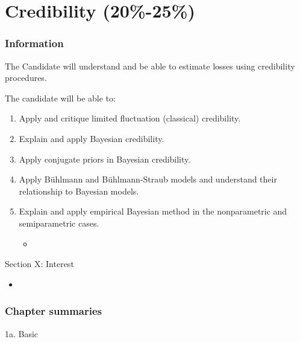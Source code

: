 \chapter[Credibility]{Credibility (20\%-25\%)}

\subsection{Information}

\begin{distributions}[Objective]
The Candidate will understand and be able to estimate losses using credibility procedures.
\end{distributions}

\begin{outcomes}
The candidate will be able to:
\begin{enumerate}[label = \alph*), leftmargin = *]
	\item	Apply and critique limited fluctuation (classical) credibility.
	\item	Explain and apply Bayesian credibility.
	\item	Apply conjugate priors in Bayesian credibility.
	\item	Apply Bühlmann and Bühlmann-Straub models and understand their relationship to Bayesian models.
	\item	Explain and apply empirical Bayesian method in the nonparametric and semiparametric cases.
		\begin{itemize}[leftmargin = *]
		\item	
		\end{itemize}
\end{enumerate}
\end{outcomes}

\begin{ASM_chapter}
Section X: Interest 
\begin{itemize}[leftmargin = *]
	\item	{}
\end{itemize}
\end{ASM_chapter}

\subsection{Chapter summaries}

\begin{CHPT_SUMM_AUTO}[label = {L.-1a}]{1a. Basic}

\end{CHPT_SUMM_AUTO}
